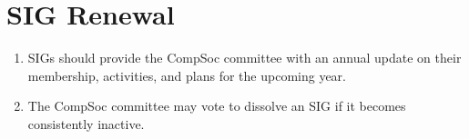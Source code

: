 \section{SIG Renewal}
\begin{enumerate}
\item SIGs should provide the CompSoc committee with an annual update on their membership, activities, and plans for the upcoming year.
\item The CompSoc committee may vote to dissolve an SIG if it becomes consistently inactive.
\end{enumerate}